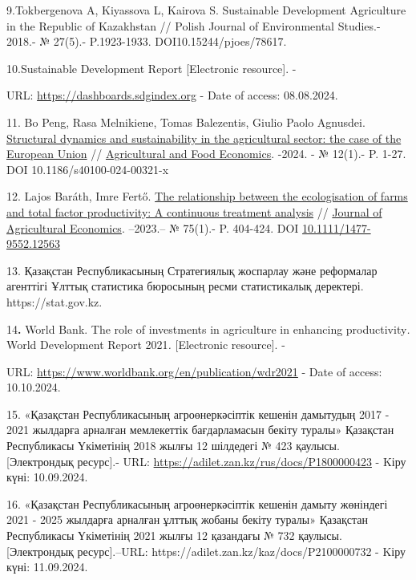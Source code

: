 \begin{references}
9.Tokbergenova A, Kiyassova L, Kairova S. Sustainable Development
Agriculture in the Republic of Kazakhstan // Polish Journal of
Environmental Studies.- 2018.- № 27(5).- P.1923-1933.
DOI10.15244/pjoes/78617.

10.Sustainable Development Report {[}Electronic resource{]}. -

URL: \url{https://dashboards.sdgindex.org} - Date of access: 08.08.2024.

11. Bo Peng, Rasa Melnikiene, Tomas Balezentis, Giulio Paolo Agnusdei.
\href{https://ideas.repec.org/a/spr/agfoec/v12y2024i1d10.1186_s40100-024-00321-x.html}{Structural
dynamics and sustainability in the agricultural sector: the case of the
European Union} //
\href{https://ideas.repec.org/s/spr/agfoec.html}{Agricultural and Food
Economics}. -2024. - № 12(1).- P. 1-27. DOI 10.1186/s40100-024-00321-x

12. Lajos Baráth, Imre Fertő.
\href{https://ideas.repec.org/a/bla/jageco/v75y2024i1p404-424.html}{The
relationship between the ecologisation of farms and total factor
productivity: A continuous treatment analysis} //
\href{https://ideas.repec.org/s/bla/jageco.html}{Journal of Agricultural
Economics}. --2023.-- № 75(1).- P. 404-424. DOI
\href{http://dx.doi.org/10.1111/1477-9552.12563}{10.1111/1477-9552.12563}

13. Қазақстан Республикасының Стратегиялық жоспарлау және реформалар
агенттігі Ұлттық статистика бюросының ресми статистикалық деректері.
https://stat.gov.kz.

14{\bfseries .} World Bank. The role of investments in agriculture in
enhancing productivity\emph{.} World Development Report 2021\emph{.}
{[}Electronic resource{]}. -

URL: \url{https://www.worldbank.org/en/publication/wdr2021} - Date of
access: 10.10.2024.

15. «Қазақстан Республикасының агроөнеркәсіптік кешенін дамытудың 2017 -
2021 жылдарға арналған мемлекеттік бағдарламасын бекіту туралы»
Қазақстан Республикасы Үкіметінің 2018 жылғы 12 шілдедегі № 423 қаулысы.
{[}Электрондық ресурс{]}.- URL:
\url{https://adilet.zan.kz/rus/docs/P1800000423} - Kіру күні:
10.09.2024.

16. «Қазақстан Республикасының агроөнеркәсіптік кешенін дамыту жөніндегі
2021 - 2025 жылдарға арналған ұлттық жобаны бекіту туралы» Қазақстан
Республикасы Үкіметінің 2021 жылғы 12 қазандағы № 732 қаулысы.
{[}Электрондық ресурс{]}.--URL:
https://adilet.zan.kz/kaz/docs/P2100000732 - Kіру күні: 11.09.2024.


\end{references}
